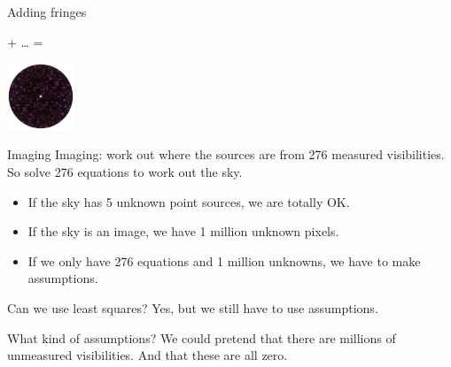 \documentclass[ignorenonframetext]{beamer}
\begin{document}
\begin{frame}{Adding fringes}
\begin{minipage}{\linewidth}
   +
   \ldots
   =
\end{minipage}
\begin{minipage}{\linewidth}
\centering
\includegraphics[height=2cm]{images/harmonics/sum_275.png}
\end{minipage}
\end{frame}

\begin{frame}{Imaging}
 Imaging: work out where the sources are from 276 measured visibilities. So solve 276 equations to work out the sky.
 \begin{itemize}
 \item If the sky has 5 unknown point sources, we are totally OK.
  \item If the sky is an image, we have 1 million unknown pixels.
  \item If we only have 276 equations and 1 million unknowns, we have to make assumptions.
 \end{itemize}
\begin{block}{Can we use least squares?}
 Yes, but we still have to use assumptions.
\end{block}
\begin{block}{What kind of assumptions?}
 We could pretend that there are millions of unmeasured visibilities. And that these are all zero.
\end{block}
\end{frame}
\end{document}
